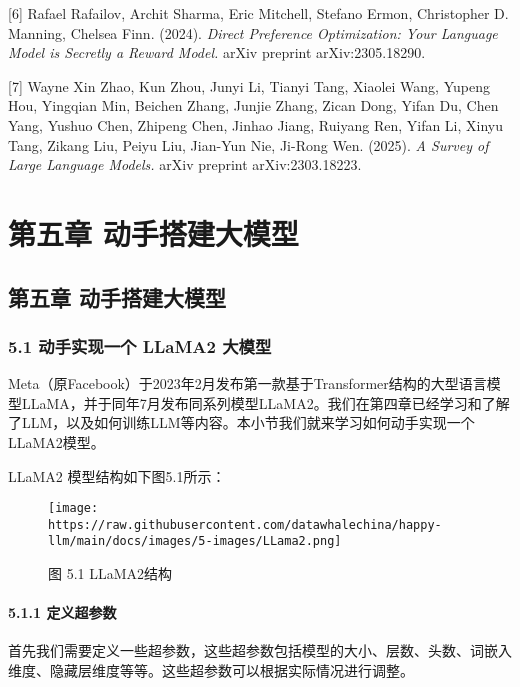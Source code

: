 \documentclass[12pt,a4paper]{book}
\begin{document}
{[}6{]} Rafael Rafailov, Archit Sharma, Eric Mitchell, Stefano Ermon,
Christopher D. Manning, Chelsea Finn. (2024). \emph{Direct Preference
Optimization: Your Language Model is Secretly a Reward Model.} arXiv
preprint arXiv:2305.18290.

{[}7{]} Wayne Xin Zhao, Kun Zhou, Junyi Li, Tianyi Tang, Xiaolei Wang,
Yupeng Hou, Yingqian Min, Beichen Zhang, Junjie Zhang, Zican Dong, Yifan
Du, Chen Yang, Yushuo Chen, Zhipeng Chen, Jinhao Jiang, Ruiyang Ren,
Yifan Li, Xinyu Tang, Zikang Liu, Peiyu Liu, Jian-Yun Nie, Ji-Rong Wen.
(2025). \emph{A Survey of Large Language Models.} arXiv preprint
arXiv:2303.18223.

\chapter{第五章 动手搭建大模型}
{
\setcounter{tocdepth}{3}
\tableofcontents
}
\section{第五章
动手搭建大模型}\label{ux7b2cux4e94ux7ae0-ux52a8ux624bux642dux5efaux5927ux6a21ux578b}

\subsection{5.1 动手实现一个 LLaMA2
大模型}\label{ux52a8ux624bux5b9eux73b0ux4e00ux4e2a-llama2-ux5927ux6a21ux578b}

Meta（原Facebook）于2023年2月发布第一款基于Transformer结构的大型语言模型LLaMA，并于同年7月发布同系列模型LLaMA2。我们在第四章已经学习和了解了LLM，以及如何训练LLM等内容。本小节我们就来学习如何动手实现一个LLaMA2模型。

LLaMA2 模型结构如下图5.1所示：

\begin{figure}[htbp]\centering
\texttt{[image: https://raw.githubusercontent.com/datawhalechina/happy-llm/main/docs/images/5-images/LLama2.png]}
\caption{图 5.1 LLaMA2结构}
\end{figure}

\subsubsection{5.1.1 定义超参数}\label{ux5b9aux4e49ux8d85ux53c2ux6570}

首先我们需要定义一些超参数，这些超参数包括模型的大小、层数、头数、词嵌入维度、隐藏层维度等等。这些超参数可以根据实际情况进行调整。
\end{document}
